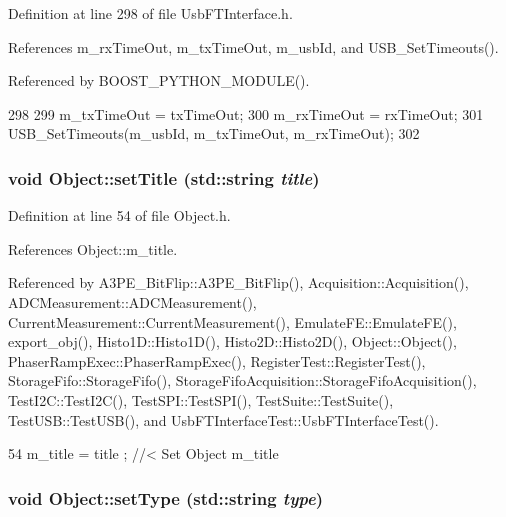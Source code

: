 Definition at line 298 of file UsbFTInterface.h.

References m\_\-rxTimeOut, m\_\-txTimeOut, m\_\-usbId, and USB\_\-SetTimeouts().

Referenced by BOOST\_\-PYTHON\_\-MODULE().


\begin{DoxyCode}
298                                                 {
299     m_txTimeOut = txTimeOut;
300     m_rxTimeOut = rxTimeOut;
301     USB_SetTimeouts(m_usbId, m_txTimeOut, m_rxTimeOut);
302   }
\end{DoxyCode}
\hypertarget{classObject_a89557dbbad5bcaa02652f5d7fa35d20f}{
\subsubsection[{setTitle}]{\setlength{\rightskip}{0pt plus 5cm}void Object::setTitle (std::string {\em title})}}
\label{classObject_a89557dbbad5bcaa02652f5d7fa35d20f}


Definition at line 54 of file Object.h.

References Object::m\_\-title.

Referenced by A3PE\_\-BitFlip::A3PE\_\-BitFlip(), Acquisition::Acquisition(), ADCMeasurement::ADCMeasurement(), CurrentMeasurement::CurrentMeasurement(), EmulateFE::EmulateFE(), export\_\-obj(), Histo1D::Histo1D(), Histo2D::Histo2D(), Object::Object(), PhaserRampExec::PhaserRampExec(), RegisterTest::RegisterTest(), StorageFifo::StorageFifo(), StorageFifoAcquisition::StorageFifoAcquisition(), TestI2C::TestI2C(), TestSPI::TestSPI(), TestSuite::TestSuite(), TestUSB::TestUSB(), and UsbFTInterfaceTest::UsbFTInterfaceTest().


\begin{DoxyCode}
54 { m_title = title ; } //< Set Object m_title
\end{DoxyCode}
\hypertarget{classObject_aae534cc9d982bcb9b99fd505f2e103a5}{
\subsubsection[{setType}]{\setlength{\rightskip}{0pt plus 5cm}void Object::setType (std::string {\em type})}}
\label{classObject_aae534cc9d982bcb9b99fd505f2e103a5}


